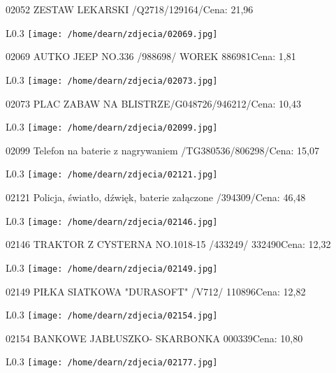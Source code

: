 02052 ZESTAW LEKARSKI /Q2718/129164/Cena: 21,96\newline
\begin{wrapfigure}{L}{0.3\textwidth}
\texttt{[image: /home/dearn/zdjecia/02069.jpg]}
\end{wrapfigure}
02069 AUTKO JEEP NO.336 /988698/  WOREK               886981Cena: 1,81\newline
\begin{wrapfigure}{L}{0.3\textwidth}
\texttt{[image: /home/dearn/zdjecia/02073.jpg]}
\end{wrapfigure}
02073 PLAC ZABAW NA BLISTRZE/G048726/946212/Cena: 10,43\newline
\begin{wrapfigure}{L}{0.3\textwidth}
\texttt{[image: /home/dearn/zdjecia/02099.jpg]}
\end{wrapfigure}
02099 Telefon na baterie z nagrywaniem /TG380536/806298/Cena: 15,07\newline
\begin{wrapfigure}{L}{0.3\textwidth}
\texttt{[image: /home/dearn/zdjecia/02121.jpg]}
\end{wrapfigure}
02121 Policja, światło, dźwięk, baterie załączone /394309/Cena: 46,48\newline
\begin{wrapfigure}{L}{0.3\textwidth}
\texttt{[image: /home/dearn/zdjecia/02146.jpg]}
\end{wrapfigure}
02146 TRAKTOR Z CYSTERNA NO.1018-15 /433249/          332490Cena: 12,32\newline
\begin{wrapfigure}{L}{0.3\textwidth}
\texttt{[image: /home/dearn/zdjecia/02149.jpg]}
\end{wrapfigure}
02149 PIŁKA SIATKOWA "DURASOFT"   /V712/              110896Cena: 12,82\newline
\begin{wrapfigure}{L}{0.3\textwidth}
\texttt{[image: /home/dearn/zdjecia/02154.jpg]}
\end{wrapfigure}
02154 BANKOWE JABŁUSZKO- SKARBONKA                    000339Cena: 10,80\newline
\begin{wrapfigure}{L}{0.3\textwidth}
\texttt{[image: /home/dearn/zdjecia/02177.jpg]}
\end{wrapfigure}
